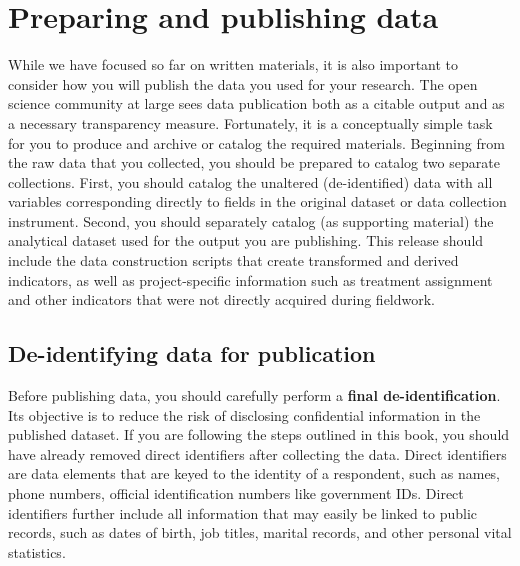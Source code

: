 
\section{Preparing and publishing data}

While we have focused so far on written materials,
it is also important to consider how you will publish
the data you used for your research.
The open science community at large sees data publication
both as a citable output and as a necessary transparency measure.
Fortunately, it is a conceptually simple task for you to produce
and archive or catalog the required materials.
Beginning from the raw data that you collected,
you should be prepared to catalog two separate collections.
First, you should catalog the unaltered (de-identified) data
with all variables corresponding directly
to fields in the original dataset or data collection instrument.
Second, you should separately catalog (as supporting material)
the analytical dataset used for the output you are publishing.
This release should include the data construction scripts
that create transformed and derived indicators,
as well as project-specific information
such as treatment assignment and other indicators
that were not directly acquired during fieldwork.

\subsection{De-identifying data for publication}

Before publishing data,
you should carefully perform a \textbf{final de-identification}.
Its objective is to reduce the risk of disclosing confidential information in the published dataset.
If you are following the steps outlined in this book,
you should have already removed direct identifiers after collecting the data.
Direct identifiers are data elements that are keyed to the identity of a respondent,
such as names, phone numbers, official identification numbers like government IDs.
Direct identifiers further include all information that may easily be linked to public records,
such as dates of birth, job titles, marital records, and other personal vital statistics.

